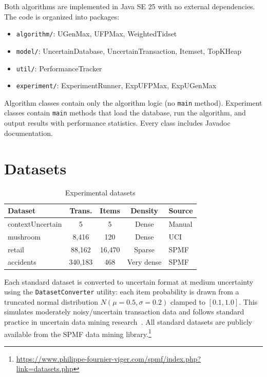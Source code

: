 \documentclass[12pt,a4paper]{report}
\begin{document}
  Both algorithms are implemented in Java SE 25 with no external dependencies. The code is organized into packages:
  \begin{itemize}
    \item \texttt{algorithm/}: UGenMax, UFPMax, WeightedTidset
    \item \texttt{model/}: UncertainDatabase, UncertainTransaction, Itemset, TopKHeap
    \item \texttt{util/}: PerformanceTracker
    \item \texttt{experiment/}: ExperimentRunner, ExpUFPMax, ExpUGenMax
  \end{itemize}

  Algorithm classes contain only the algorithm logic (no \texttt{main} method). Experiment classes contain \texttt{main} methods that load the database, run the algorithm, and output results with performance statistics. Every class includes Javadoc documentation.

  \section{Datasets}

  \begin{table}[h]
    \centering
    \caption{Experimental datasets}
    \begin{tabular}{lcccl}
      \toprule
      \textbf{Dataset} & \textbf{Trans.} & \textbf{Items} & \textbf{Density} & \textbf{Source} \\
      \midrule
      contextUncertain & 5 & 5 & Dense & Manual \\
      mushroom & 8,416 & 120 & Dense & UCI \\
      retail & 88,162 & 16,470 & Sparse & SPMF \\
      accidents & 340,183 & 468 & Very dense & SPMF \\
      \bottomrule
    \end{tabular}
  \end{table}

  Each standard dataset is converted to uncertain format at medium uncertainty using the \texttt{DatasetConverter} utility: each item probability is drawn from a truncated normal distribution $N(\mu{=}0.5, \sigma{=}0.2)$ clamped to $[0.1, 1.0]$. This simulates moderately noisy/uncertain transaction data and follows standard practice in uncertain data mining research~\cite{chui2007,leung2008}. All standard datasets are publicly available from the SPMF data mining library.\footnote{\url{https://www.philippe-fournier-viger.com/spmf/index.php?link=datasets.php}}
\end{document}
